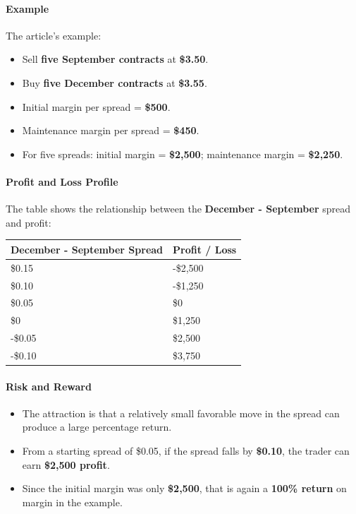 \documentclass[12pt,openany]{book}
\begin{document}
\paragraph{Example}

The article's example:

\begin{itemize}[leftmargin=*]
    \item Sell \textbf{five September contracts} at \textbf{\$3.50}.
    \item Buy \textbf{five December contracts} at \textbf{\$3.55}.
    \item Initial margin per spread = \textbf{\$500}.
    \item Maintenance margin per spread = \textbf{\$450}.
    \item For five spreads: initial margin = \textbf{\$2,500}; maintenance margin = \textbf{\$2,250}.
\end{itemize}

\paragraph{Profit and Loss Profile}

The table shows the relationship between the \textbf{December - September} spread and profit:

\begin{center}
\small
\begin{tabular}{|L{0.34\textwidth}|L{0.28\textwidth}|}
\hline
\textbf{December - September Spread} & \textbf{Profit / Loss} \\ \hline
\$0.15 & -\$2,500 \\ \hline
\$0.10 & -\$1,250 \\ \hline
\$0.05 & \$0 \\ \hline
\$0 & \$1,250 \\ \hline
-\$0.05 & \$2,500 \\ \hline
-\$0.10 & \$3,750 \\ \hline
\end{tabular}
\end{center}

\paragraph{Risk and Reward}

\begin{itemize}[leftmargin=*]
    \item The attraction is that a relatively small favorable move in the spread can produce a large percentage return.
    \item From a starting spread of \$0.05, if the spread falls by \textbf{\$0.10}, the trader can earn \textbf{\$2,500 profit}.
    \item Since the initial margin was only \textbf{\$2,500}, that is again a \textbf{100\% return} on margin in the example.
\end{itemize}
\end{document}
